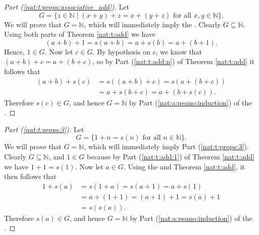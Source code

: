 \begin{proof}[Part (\ref{nat:t:props:associative_add})]
	Let
	\[
		G = \{ z \in \mathbb{N} \mid (x + y) + z = x + (y + z) \text{ for all } x, y \in \mathbb{N} \}.
	\]
	We will prove that $G = \mathbb{N}$, which will immediately imply the . Clearly $G \subseteq \mathbb{N}$. Using both parts of Theorem \ref{nat:t:add} we have
	\[
		(a + b) + 1 = s(a + b) = a + s(b) = a + (b + 1).
	\]
	Hence, $1 \in G$. Now let $c \in G$. By hypothesis on $c$, we know that $(a + b) + c = a + (b + c)$, so by Part (\ref{nat:t:add:n}) of Theorem \ref{nat:t:add} it follows that
	\begin{align*}
		(a + b) + s(c) & = s((a + b) + c) = s(a + (b + c)) \\
		               & = a + s(b + c) = a + (b + s(c)).
	\end{align*}
	Therefore $s(c) \in G$, and hence $G = \mathbb{N}$ by Part (\ref{nat:a:peano:induction}) of the .
\end{proof}

\begin{proof}[Part (\ref{nat:t:props:3})]
	Let
	\[
		G = \{ 1 + n = s(n) \text{ for all } n \in \mathbb{N} \}.
	\]
	We will prove that $G = \mathbb{N}$, which will immediately imply Part (\ref{nat:t:props:3}). Clearly $G \subseteq \mathbb{N}$, and $1 \in G$ because by Part (\ref{nat:t:add:1}) of Theorem \ref{nat:t:add} we have $1 + 1 = s(1)$. Now let $a \in G$. Using the  and Theorem \ref{nat:t:add}, it then follows that
	\begin{align*}
		1 + s(a) & = s(1 + a) = s(a + 1) = a + s(1)       \\
		         & = a + (1 + 1) = (a + 1) + 1 = s(a) + 1 \\
		         & = s(s(a)).
	\end{align*}
	Therefore $s(a) \in G$, and hence $G = \mathbb{N}$ by Part (\ref{nat:a:peano:induction}) of the .
\end{proof}

